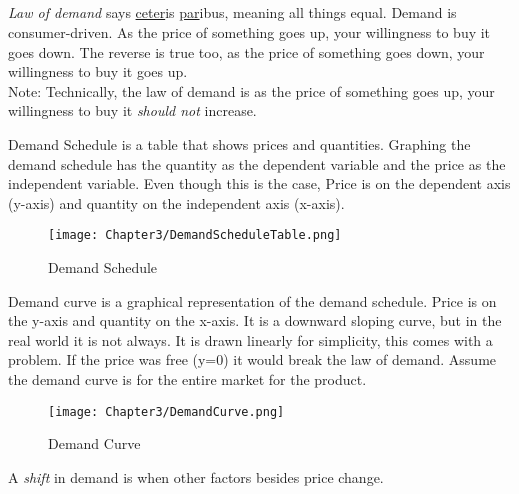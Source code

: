 \subsection{}

\begin{definition}
    \emph{Law of demand} says \underline{ceter}is \underline{par}ibus, meaning all things equal. Demand is consumer-driven.
    As the price of something goes up, your willingness to buy it goes down. The reverse is true too,
    as the price of something goes down, your willingness to buy it goes up.\\
    Note: Technically, the law of demand is as the price of something goes up, your willingness to buy it \emph{should not} increase.
\end{definition}
\begin{definition}
    Demand Schedule is a table that shows prices and quantities. Graphing the demand schedule has the 
    quantity as the dependent variable and the price as the independent variable. Even though this is the case,
    Price is on the dependent axis (y-axis) and quantity on the independent axis (x-axis).
\end{definition}
\begin{figure}[H]
    \centering
    \texttt{[image: Chapter3/DemandScheduleTable.png]}
    \caption{Demand Schedule}
\end{figure}
\begin{definition}
    Demand curve is a graphical representation of the demand schedule. Price is on the y-axis and quantity on the x-axis.
    It is a downward sloping curve, but in the real world it is not always. It is drawn linearly for simplicity, this comes with a problem.
    If the price was free (y=0) it would break the law of demand. Assume the demand curve is for the entire market for the product.
\end{definition}
\begin{figure}[H]
    \centering
    \texttt{[image: Chapter3/DemandCurve.png]}
    \caption{Demand Curve}
\end{figure}
\begin{definition}
    A \emph{shift} in demand is when other factors besides price change.
\end{definition}
